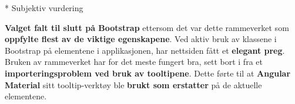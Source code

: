 \begin{table}[H]
\centering
{}
* Subjektiv vurdering
\caption{Sammenligning av Bootstrap, Foundation og Angular Material.}
\end{table}

\noindent \textbf{Valget falt til slutt på Bootstrap} ettersom det var dette rammeverket som \textbf{oppfylte flest av de viktige egenskapene}. Ved aktiv bruk av klassene i Bootstrap på elementene i applikasjonen, har nettsiden fått et \textbf{elegant preg}. Bruken av rammeverket har for det meste fungert bra, sett bort i fra et \textbf{importeringsproblem ved bruk av tooltipene}. Dette førte til at \textbf{Angular Material} sitt tooltip-verktøy ble \textbf{brukt som erstatter} på de aktuelle elementene. 

